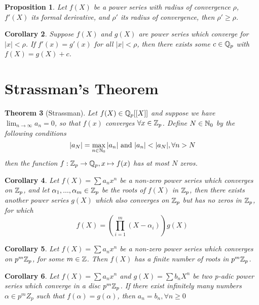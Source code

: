 \documentclass{article}
\theoremstyle{plain}
\newtheorem{thm}{Theorem}[section]
\newtheorem{prop}[thm]{Proposition}
\newtheorem{Cor}[thm]{Corollary}
\theoremstyle{definition}
\begin{document}
	\begin{minipage}[t]{0.48\textwidth}
		\begin{prop}
		Let $f(X)$ be a power series with radius of convergence $\rho$, $f'(X)$ its formal derivative, and $\rho'$ its radius of convergence, then $\rho' \geq \rho$.
		\end{prop}
		\begin{Cor} Suppose $f(X)$ and $g(X)$ are power series which converge for $|x| < \rho$. If $f'(x)=g'(x)$ for all $|x| < \rho$, then there exists some $c \in \Bbb Q_{p}$ with $f(X)=g(X)+c$.
		\end{Cor}
	\section{Strassman's Theorem}
		\begin{thm}[Strassman]
		Let $f(X) \in \Bbb Q_{p}[[X]]$ and suppose we have $\lim_{n \to \infty}a_{n} = 0$, so that $f(x)$ converges $\forall x \in \Bbb Z_{p}$. Define $N \in \Bbb N_{0}$ by the following conditions
		$$|a_{N}| = \max_{n \in \Bbb N_{0}}|a_{n}| \text{ and }|a_{n}| < |a_{N}|, \forall n > N$$
		then the function $f:\Bbb Z_{p} \to \Bbb Q_{p}, x \mapsto f(x)$ has at most $N$ zeros.
		\end{thm}
		\begin{Cor}
		Let $f(X) = \sum a_{n}x^{n}$ be a non-zero power series which converges on $\Bbb Z_{p}$, and let $\alpha_{1}, ..., \alpha_{m} \in \Bbb Z_{p}$ be the roots of $f(X)$ in $\Bbb Z_{p}$, then there exists another power series $g(X)$ which also converges on $\Bbb Z_{p}$ but has no zeros in $\Bbb Z_{p}$, for which
		$$f(X) = \left(\prod_{i=1}^{m}(X-\alpha_{i})\right)g(X)$$
		\end{Cor}
		\begin{Cor}
		Let $f(X) = \sum a_{n}x^{n}$ be a non-zero power series which converges on $p^{m}\Bbb Z_{p}$, for some $m \in \Bbb Z$. Then $f(X)$ has a finite number of roots in $p^{m} \Bbb Z_{p}$.
		\end{Cor}
		\begin{Cor}
		Let $f(X) = \sum a_{n}x^{n}$ and $g(X) = \sum b_{n}X^{n}$ be two p-adic power series which converge in a disc $p^{m}\Bbb Z_{p}$. If there exist infinitely many numbers $\alpha \in p^{m}Z_{p}$ such that $f(\alpha) = g(\alpha)$, then $a_{n} = b_{n}, \forall n \geq 0$
		\end{Cor}
	\end{minipage}%
	\hfill
\end{document}
